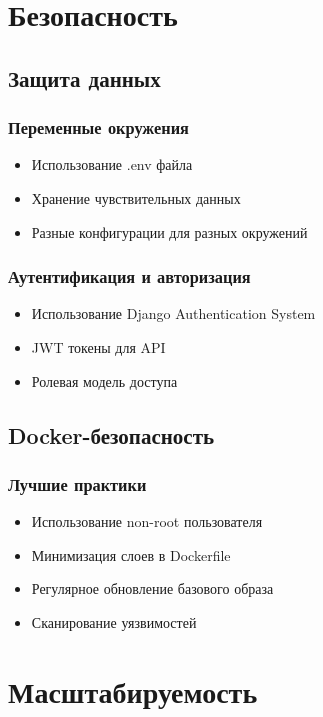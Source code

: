 \documentclass[12pt,a4paper]{article}
\begin{document}
\section{Безопасность}
\subsection{Защита данных}
\subsubsection{Переменные окружения}
\begin{itemize}
    \item Использование .env файла
    \item Хранение чувствительных данных
    \item Разные конфигурации для разных окружений
\end{itemize}

\subsubsection{Аутентификация и авторизация}
\begin{itemize}
    \item Использование Django Authentication System
    \item JWT токены для API
    \item Ролевая модель доступа
\end{itemize}

\subsection{Docker-безопасность}
\subsubsection{Лучшие практики}
\begin{itemize}
    \item Использование non-root пользователя
    \item Минимизация слоев в Dockerfile
    \item Регулярное обновление базового образа
    \item Сканирование уязвимостей
\end{itemize}

\section{Масштабируемость}
\end{document}
